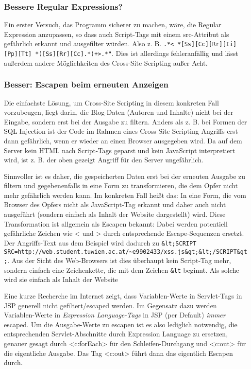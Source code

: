\subsubsection{Bessere Regular Expressions?}

Ein erster Versuch, das Programm sicherer zu machen, wäre, die Regular Expression anzupassen, so dass auch Script-Tags mit einem src-Attribut als gefährlich erkannt und ausgefilter würden. Also z. B. \lstinline$.*< *[Ss][Cc][Rr][Ii][Pp][Tt] *([Ss][Rr][Cc].*)+>.*"$. Dies ist allerdings fehleranfällig und lässt außerdem andere Möglichkeiten des Cross-Site Scripting außer Acht.

\subsubsection{Besser: Escapen beim erneuten Anzeigen}

Die einfachste Lösung, um Cross-Site Scripting in diesem konkreten Fall vorzubeugen, liegt darin, die Blog-Daten (Autoren und Inhalte) nicht bei der Eingabe, sondern erst bei der Ausgabe zu filtern. Anders als z. B. bei Formen der SQL-Injection ist der Code im Rahmen eines Cross-Site Scripting Angriffs erst dann gefährlich, wenn er wieder an einen Browser ausgegeben wird. Da auf dem Server kein HTML nach Script-Tags geparst und kein JavaScript interpretiert wird, ist z. B. der oben gezeigt Angriff für den Server ungefährlich.

Sinnvoller ist es daher, die gespeicherten Daten erst bei der erneuten Ausgabe zu filtern und gegebenenfalls in eine Form zu transformieren, die dem Opfer nicht mehr gefährlich werden kann. Im konkreten Fall heißt das: In eine Form, die vom Browser des Opfers nicht als JavaScript-Tag erkannt und daher auch nicht ausgeführt (sondern einfach als Inhalt der Website dargestellt) wird. Diese Transformation ist allgemein als Escapen bekannt: Dabei werden potentiell gefährliche Zeichen wie < und > durch entsprechende Escape-Sequenzen ersetzt. Der Angriffs-Text aus dem Beispiel wird dadurch zu \lstinline$&lt;SCRIPT SRC=http://web.student.tuwien.ac.at/~e9902433/xss.js&gt;&lt;/SCRIPT&gt;$. Aus der Sicht des Web-Browsers ist dies überhaupt kein Script-Tag mehr, sondern einfach eine Zeichenkette, die mit dem Zeichen \lstinline$&lt$ beginnt. Als solche wird sie einfach als Inhalt der Website 

Eine kurze Recherche im Internet zeigt, dass Variablen-Werte in Servlet-Tags in JSP generell nicht gefiltert/escaped werden. Im Gegensatz dazu werden Variablen-Werte in \emph{Expression Language-Tags} in JSP (per Default) \emph{immer} escaped. Um die Ausgabe-Werte zu escapen ist es also lediglich notwendig, die entsprechenden Servlet-Abschnitte durch Expression Language zu ersetzen, genauer gesagt durch <c:forEach> für den Schleifen-Durchgang und <c:out> für die eigentliche Ausgabe. Das Tag <c:out> führt dann das eigentlich Escapen durch.

